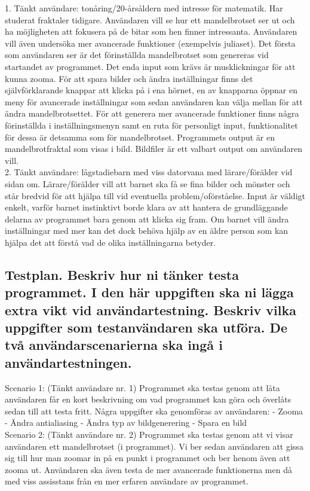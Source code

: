 \documentclass[11pt]{article} %
\begin{document}
1. Tänkt användare: tonåring/20-årsåldern med intresse för matematik. Har studerat fraktaler tidigare.
Användaren vill se hur ett mandelbrotset ser ut och ha möjligheten att fokusera på de bitar som hen finner intressanta. Användaren vill även undersöka mer avancerade funktioner (exempelvis juliaset).
Det första som användaren ser är det förinställda mandelbrotset som genereras vid startandet av programmet. Det enda input som krävs är musklickningar för att kunna zooma. För att spara bilder och ändra inställningar finns det självförklarande knappar att klicka på i ena hörnet, en av knapparna öppnar en meny för avancerade inställningar som sedan användaren kan välja mellan för att ändra mandelbrotsettet. För att generera mer avancerade funktioner finns några förinställda i inställningsmenyn samt en ruta för personligt input, funktionalitet för dessa är detsamma som för mandelbrotset.
Programmets output är en mandelbrotfraktal som visas i bild. Bildfiler är ett valbart output om användaren vill. \\

2. Tänkt användare: lågstadiebarn med viss datorvana med lärare/förälder vid sidan om.
Lärare/förälder vill att barnet ska få se fina bilder och mönster och står bredvid för att hjälpa till vid eventuella problem/oförståelse.
Input är väldigt enkelt, varför barnet instinktivt borde klara av att hantera de grundläggande delarna av programmet bara genom att klicka sig fram. Om barnet vill ändra inställningar med mer kan det dock behöva hjälp av en äldre person som kan hjälpa det att förstå vad de olika inställningarna betyder. 
    

\subsection{Testplan. Beskriv hur ni tänker testa programmet. I den här uppgiften ska ni lägga extra vikt vid användartestning. Beskriv vilka uppgifter som testanvändaren ska utföra. De två användarscenarierna ska ingå i användartestningen.}

Scenario 1: (Tänkt användare nr. 1) Programmet ska testas genom att låta användaren får en kort beskrivning om vad programmet kan göra och överlåts sedan till att testa fritt. 
Några uppgifter ska genomföras av användaren:
- Zooma
- Ändra antialiasing
- Ändra typ av bildgenerering
- Spara en bild \\

Scenario 2: (Tänkt användare nr. 2) Programmet ska testas genom att vi visar användaren ett mandelbrotset (i programmet). Vi ber sedan användaren att gissa sig till hur man zoomar in på en punkt i programmet och ber henom även att zooma ut. Användaren ska även testa de mer avancerade funktionerna men då med viss assisstans från en mer erfaren användare av programmet.
\end{document}
